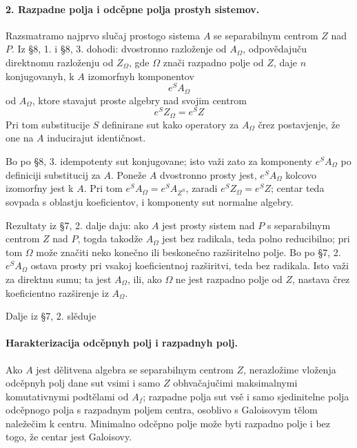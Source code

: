 \documentclass[11pt]{article}
\begin{document}
\paragraph{2. Razpadne polja i odcěpne polja prostyh sistemov.}
Razsmatramo najprvo slučaj prostogo sistema \(A\) se separabilnym centrom \(Z\) nad \(P\). Iz §8, 1. i §8, 3. dohodi: dvostronno razloženje od \(A_\Omega\), odpovědajuču direktnomu razloženju od \(Z_\Omega\), gde \(\Omega\) znači razpadno polje od \(Z\), daje \(n\) konjugovanyh, k \(A\) izomorfnyh komponentov
\[
        e^S A_\Omega
\]
od \(A_\Omega\), ktore stavajut proste algebry nad svojim centrom
\[
        e^S Z_\Omega=e^S Z
\]
Pri tom substitucije \(S\) definirane sut kako operatory za \(A_\Omega\) črez postavjenje, že one na \(A\) inducirajut identičnost.

Bo po §8, 3. idempotenty sut konjugovane; isto važi zato za komponenty \(e^S A_\Omega\) po definiciji substitucij za \(A\). Poneže \(A\) dvostronno prosty jest, \(e^S A_\Omega\) kolcovo izomorfny jest k \(A\). Pri tom \(e^SA_\Omega=e^S A_{Z^{S}}\), zaradi \(e^S Z_\Omega=e^S Z\); centar teda sovpada s oblastju koeficientov, i komponenty sut normalne algebry.

Rezultaty iz §7, 2. dalje daju: ako \(A\) jest prosty sistem nad \(P\) s separabilnym centrom \(Z\) nad \(P\), togda takodže \(A_\Omega\) jest bez radikala, teda polno reducibilno; pri tom \(\Omega\) može značiti neko konečno ili beskonečno razširitelno polje. Bo po §7, 2. \(e^S A_\Omega\) ostava prosty pri vsakoj koeficientnoj razširitvi, teda bez radikala. Isto važi za direktnu sumu; ta jest \(A_\Omega\), ili, ako \(\Omega\) ne jest razpadno polje od \(Z\), nastava črez koeficientno razširenje iz \(A_\Omega\).

Dalje iz §7, 2. slěduje

\paragraph{Harakterizacija odcěpnyh polj i razpadnyh polj.}
Ako \(A\) jest dělitvena algebra se separabilnym centrom \(Z\), nerazložime vloženja odcěpnyh polj dane sut vsimi i samo \(Z\) obhvačajučimi maksimalnymi komutativnymi podtělami od \(A_f\); razpadne polja sut vsě i samo sjedinitelne polja odcěpnogo polja s razpadnym poljem centra, osoblivo s Galoisovym tělom naležečim k centru. Minimalno odcěpno polje može byti razpadno polje i bez togo, že centar jest Galoisovy.
\end{document}
